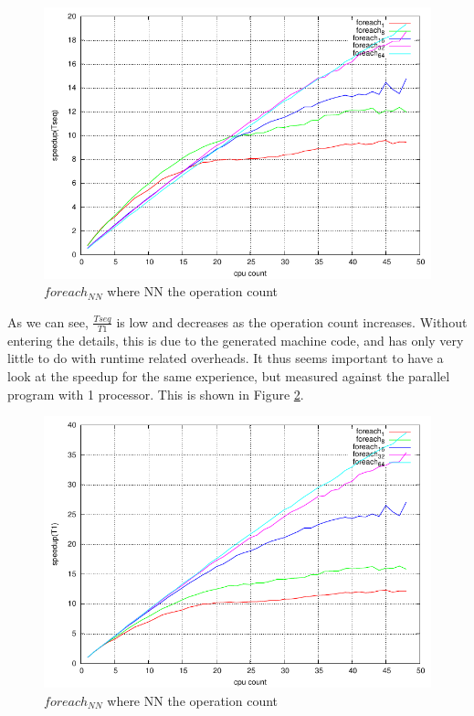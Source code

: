 \documentclass[a4paper, 11pt]{article}
\begin{document}
\begin{figure}[!hb]
\centering
\includegraphics[keepaspectratio=true, width=\linewidth]{../graphs/foreach_speedups.pdf}
\caption{$foreach_{NN}$ where NN the operation count}
\label{foreach_speedups}
\end{figure}

As we can see, $\frac{Tseq}{T1}$ is low and decreases as the operation count increases. Without entering the details,
this is due to the generated machine code, and has only very little to do with runtime related overheads. It thus
seems important to have a look at the speedup for the same experience, but measured against the parallel program with
1 processor. This is shown in Figure \ref{foreach_speedups_t1}.

\begin{figure}[!ht]
\centering
\includegraphics[keepaspectratio=true, width=\linewidth]{../graphs/foreach_speedups_t1.pdf}
\caption{$foreach_{NN}$ where NN the operation count}
\label{foreach_speedups_t1}
\end{figure}
\end{document}
